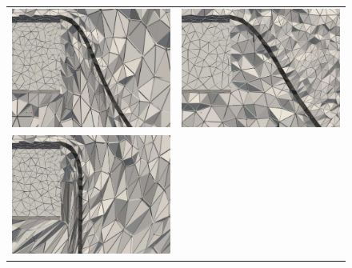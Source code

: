 \begin{figure}
\begin{tabular}{cc}
    \includegraphics[width=\twofigs]{chapters/hoffman-2/pdf/force_smooth02.pdf} &
    \includegraphics[width=\twofigs]{chapters/hoffman-2/pdf/force_hybrid02.pdf}\\
    \includegraphics[width=\twofigs]{chapters/hoffman-2/pdf/force_smooth03.pdf} &

\end{tabular}
\end{figure}
